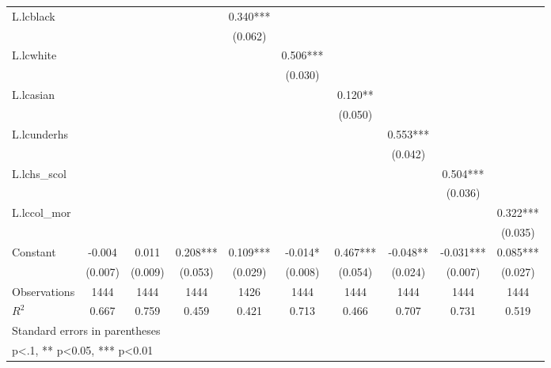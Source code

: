 \begin{table}[htbp]
\begin{tabular}{l*{9}{c}}
\addlinespace
L.lcblack           &            &            &            &    0.340***&            &            &            &            &            \\
                    &            &            &            &  (0.062)   &            &            &            &            &            \\
\addlinespace
L.lcwhite           &            &            &            &            &    0.506***&            &            &            &            \\
                    &            &            &            &            &  (0.030)   &            &            &            &            \\
\addlinespace
L.lcasian           &            &            &            &            &            &    0.120** &            &            &            \\
                    &            &            &            &            &            &  (0.050)   &            &            &            \\
\addlinespace
L.lcunderhs         &            &            &            &            &            &            &    0.553***&            &            \\
                    &            &            &            &            &            &            &  (0.042)   &            &            \\
\addlinespace
L.lchs\_scol         &            &            &            &            &            &            &            &    0.504***&            \\
                    &            &            &            &            &            &            &            &  (0.036)   &            \\
\addlinespace
L.lccol\_mor         &            &            &            &            &            &            &            &            &    0.322***\\
                    &            &            &            &            &            &            &            &            &  (0.035)   \\
\addlinespace
Constant            &   -0.004   &    0.011   &    0.208***&    0.109***&   -0.014*  &    0.467***&   -0.048** &   -0.031***&    0.085***\\
                    &  (0.007)   &  (0.009)   &  (0.053)   &  (0.029)   &  (0.008)   &  (0.054)   &  (0.024)   &  (0.007)   &  (0.027)   \\
\midrule
Observations        &     1444   &     1444   &     1444   &     1426   &     1444   &     1444   &     1444   &     1444   &     1444   \\
\(R^{2}\)           &    0.667   &    0.759   &    0.459   &    0.421   &    0.713   &    0.466   &    0.707   &    0.731   &    0.519   \\
\bottomrule
\multicolumn{10}{l}{\footnotesize Standard errors in parentheses}\\
\multicolumn{10}{l}{\footnotesize * p<.1, ** p<0.05, *** p<0.01}\\
\end{tabular}
\end{table}
